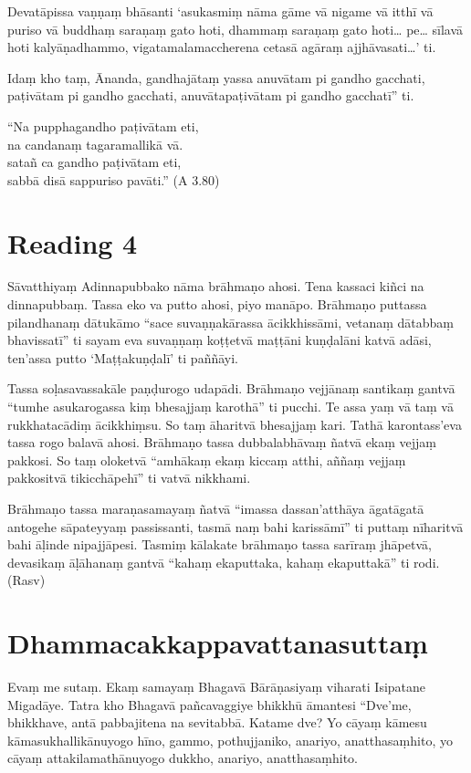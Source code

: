 Devatāpissa vaṇṇaṃ bhāsanti ‘asukasmiṃ nāma gāme vā nigame vā itthī vā puriso vā buddhaṃ saraṇaṃ gato hoti, dhammaṃ saraṇaṃ gato hoti… pe… sīlavā hoti kalyāṇadhammo, vigatamalamaccherena cetasā agāraṃ ajjhāvasati…’ ti.

Idaṃ kho taṃ, Ānanda, gandhajātaṃ yassa anuvātam pi gandho gacchati, paṭivātam pi gandho gacchati, anuvātapaṭivātam pi gandho gacchatī” ti.

“Na pupphagandho paṭivātam eti,\\
na candanaṃ tagaramallikā vā.\\
satañ ca gandho paṭivātam eti,\\
sabbā disā sappuriso pavāti.” \hfill(A 3.80)

\section*{Reading 4}

Sāvatthiyaṃ Adinnapubbako nāma brāhmaṇo ahosi. Tena kassaci kiñci na dinnapubbaṃ. Tassa eko va putto ahosi, piyo manāpo. Brāhmaṇo puttassa pilandhanaṃ dātukāmo “sace suvaṇṇakārassa ācikkhissāmi, vetanaṃ dātabbaṃ bhavissatī” ti sayam eva suvaṇṇaṃ koṭṭetvā maṭṭāni kuṇḍalāni katvā adāsi, ten’assa putto ‘Maṭṭakuṇḍalī’ ti paññāyi.

Tassa soḷasavassakāle paṇḍurogo udapādi. Brāhmaṇo vejjānaṃ santikaṃ gantvā “tumhe asukarogassa kiṃ bhesajjaṃ karothā” ti pucchi. Te assa yaṃ vā taṃ vā rukkhatacādiṃ ācikkhiṃsu. So taṃ āharitvā bhesajjaṃ kari. Tathā karontass’eva tassa rogo balavā ahosi. Brāhmaṇo tassa dubbalabhāvaṃ ñatvā ekaṃ vejjaṃ pakkosi. So taṃ oloketvā “amhākaṃ ekaṃ kiccaṃ atthi, aññaṃ vejjaṃ pakkositvā tikicchāpehī” ti vatvā nikkhami.

Brāhmaṇo tassa maraṇasamayaṃ ñatvā “imassa dassan’atthāya āgatāgatā antogehe sāpateyyaṃ passissanti, tasmā naṃ bahi karissāmī” ti puttaṃ nīharitvā bahi āḷinde nipajjāpesi. Tasmiṃ kālakate brāhmaṇo tassa sarīraṃ jhāpetvā, devasikaṃ āḷāhanaṃ gantvā “kahaṃ ekaputtaka, kahaṃ ekaputtakā” ti rodi. \hfill(Rasv)

\section*{Dhammacakkappavattanasuttaṃ}

Evaṃ me sutaṃ. Ekaṃ samayaṃ Bhagavā Bārāṇasiyaṃ viharati Isipatane Migadāye. Tatra kho Bhagavā pañcavaggiye bhikkhū āmantesi “Dve’me, bhikkhave, antā pabbajitena na sevitabbā. Katame dve? Yo cāyaṃ kāmesu kāmasukhallikānuyogo hīno, gammo, pothujjaniko, anariyo, anatthasaṃhito, yo cāyaṃ attakilamathānuyogo dukkho, anariyo, anatthasaṃhito.

